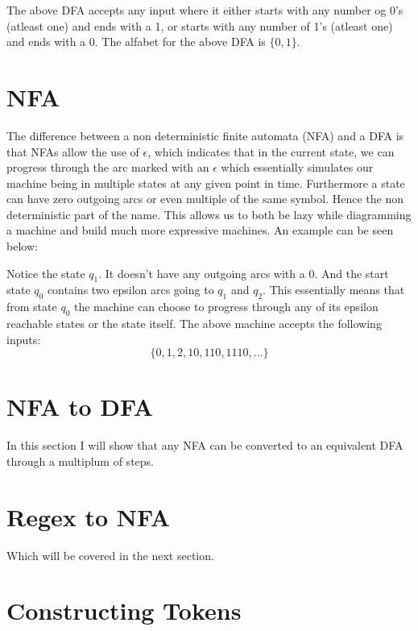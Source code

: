The above DFA accepts any input where it either starts with any number og 0's (atleast one) and ends with a 1, or starts with any number of 1's (atleast one) and ends with a 0. The alfabet for the above DFA is $\{0, 1\}$.

\section*{NFA}

The difference between a non deterministic finite automata (NFA) and a DFA is that NFAs allow the use of $\epsilon$, which indicates that in the current state, we can progress through the arc marked with an $\epsilon$ which essentially simulates our machine being in multiple states at any given point in time. Furthermore a state can have zero outgoing arcs or even multiple of the same symbol. Hence the non deterministic part of the name. This allows us to both be lazy while diagramming a machine and build much more expressive machines. An example can be seen below:


\begin{center}
\end{center}

Notice the state $q_1$. It doesn't have any outgoing arcs with a $0$. And the start state $q_0$ contains two epsilon arcs going to $q_1$ and $q_2$. This essentially means that from state $q_0$ the machine can choose to progress through any of its epsilon reachable states or the state itself. The above machine accepts the following inputs:
\[\{0, 1, 2, 10, 110, 1110, \dots\}\]

\section*{NFA to DFA}

In this section I will show that any NFA can be converted to an equivalent DFA through a multiplum of steps.

\section*{Regex to NFA}
Which will be covered in the next section.

\section*{Constructing Tokens}


